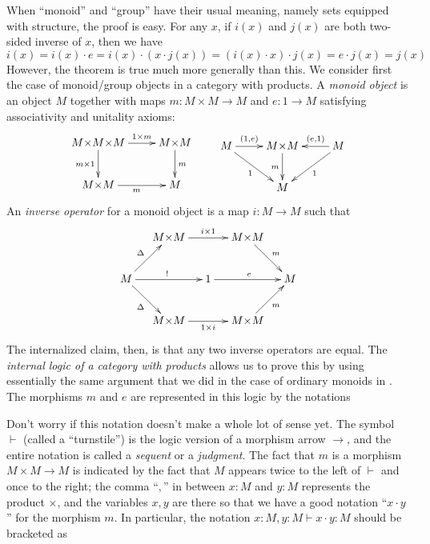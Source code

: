 \documentclass{book}
\let\types\vdash
\begin{document}
When ``monoid'' and ``group'' have their usual meaning, namely sets equipped with structure, the proof is easy.
For any $x$, if $i(x)$ and $j(x)$ are both two-sided inverse of $x$, then we have
\[ i(x) = i(x) \cdot e = i(x) \cdot (x \cdot j(x)) = (i(x)\cdot x)\cdot j(x) = e\cdot j(x) = j(x) \]
However, the theorem is true much more generally than this.
We consider first the case of monoid/group objects in a category with products.
A \emph{monoid object} is an object $M$ together with maps $m:M\times M \to M$ and $e:1\to M$ satisfying associativity and unitality axioms:
\begin{equation}
  \vcenter{\xymatrix{
      M\times M\times M\ar[r]^-{1\times m}\ar[d]_{m\times 1} &
      M\times M\ar[d]^m\\
      M\times M\ar[r]_m &
      M
    }}
  \qquad
  \vcenter{\xymatrix{ M \ar[r]^-{(1,e)} \ar[dr]_{1} &
    M\times M \ar[d]_m & M \ar[l]_-{(e,1)} \ar[dl]^{1} \\
    & M }}
\end{equation}
An \emph{inverse operator} for a monoid object is a map $i:M\to M$ such that
\begin{equation}
  \vcenter{\xymatrix@C=1pc{& M\times M \ar[rr]^{i\times 1} && M\times M \ar[dr]^m \\
      M \ar[ur]^{\Delta} \ar[dr]_{\Delta} \ar[rr]^{!} && 1 \ar[rr]^{e} && M \\
      & M\times M \ar[rr]_{1\times i} && M\times M \ar[ur]_{m}}}
\end{equation}
The internalized claim, then, is that any two inverse operators are equal.
The \emph{internal logic of a category with products} allows us to prove this by using essentially the same argument that we did in the case of ordinary monoids in \bSet.
The morphisms $m$ and $e$ are represented in this logic by the notations
Don't worry if this notation doesn't make a whole lot of sense yet.
The symbol $\types$ (called a ``turnstile'') is the logic version of a morphism arrow $\to$, and the entire notation is called a \emph{sequent} or a \emph{judgment}.
The fact that $m$ is a morphism $M\times M \to M$ is indicated by the fact that $M$ appears twice to the left of $\types$ and once to the right; the comma ``$,$'' in between $x:M$ and $y:M$ represents the product $\times$, and the variables $x,y$ are there so that we have a good notation ``$x\cdot y$'' for the morphism $m$.
In particular, the notation $x:M,y:M \types x\cdot y :M$ should be bracketed as
\end{document}
